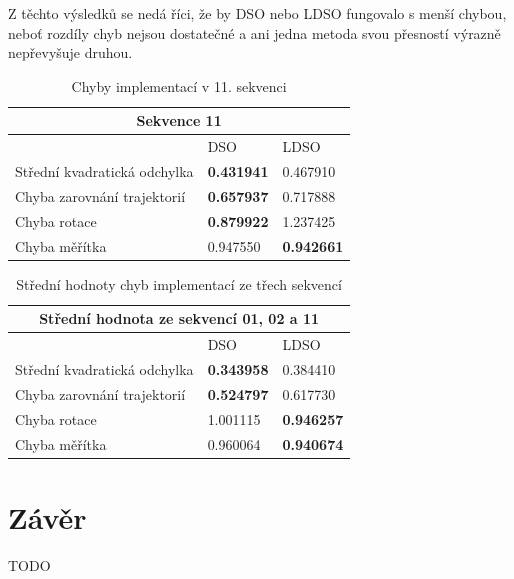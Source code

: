 \documentclass[12pt,a4paper]{article}
\begin{document}
Z těchto výsledků se nedá říci, že by DSO nebo LDSO fungovalo s menší chybou, neboť rozdíly chyb nejsou dostatečné a ani jedna metoda svou přesností výrazně nepřevyšuje druhou.
\begin{table}[H]
\centering
\begin{tabular}{|l|l|l|}
\hline
\multicolumn{3}{|c|}{\textbf{Sekvence 11}} \\
\hline
 & DSO & LDSO \\
\hline
Střední kvadratická odchylka & \textbf{0.431941} & 0.467910 \\
Chyba zarovnání trajektorií & \textbf{0.657937} & 0.717888 \\
Chyba rotace & \textbf{0.879922} & 1.237425 \\
Chyba měřítka & 0.947550 & \textbf{0.942661} \\
\hline
\end{tabular}
\caption{Chyby implementací v 11. sekvenci}
\end{table}


\noindent
\begin{table}[H]
\centering
\begin{tabular}{|l|l|l|}
\hline
\multicolumn{3}{|c|}{\textbf{Střední hodnota ze sekvencí 01, 02 a 11}} \\
\hline
 & DSO & LDSO \\
\hline
Střední kvadratická odchylka & \textbf{0.343958} & 0.384410 \\
Chyba zarovnání trajektorií & \textbf{0.524797} & 0.617730 \\
Chyba rotace & 1.001115 & \textbf{0.946257} \\
Chyba měřítka & 0.960064 & \textbf{0.940674} \\
\hline
\end{tabular}
\caption{Střední hodnoty chyb implementací ze třech sekvencí}
\end{table}


\section{Závěr}
TODO


\newpage

\end{document}
